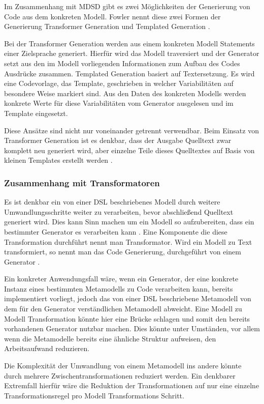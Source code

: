 \documentclass[12pt,oneside,a4paper,parskip]{scrbook}
\begin{document}
Im Zusammenhang mit MDSD gibt es zwei Möglichkeiten der Generierung von Code aus dem konkreten Modell. Fowler nennt diese zwei Formen der Generierung Transformer Generation und Templated Generation \cite[S. 124f.]{fowler2010}.

Bei der Transformer Generation werden aus einem konkreten Modell Statements einer Zielsprache generiert. Hierfür wird das Modell traversiert und der Generator setzt aus den im Modell vorliegenden Informationen zum Aufbau des Codes Ausdrücke zusammen. Templated Generation basiert auf Textersetzung. Es wird eine Codevorlage, das Template, geschrieben in welcher Variabilitäten auf besondere Weise markiert sind. Aus den Daten des konkreten Modells werden konkrete Werte für diese Variabilitäten vom Generator ausgelesen und im Template eingesetzt.

Diese Ansätze sind nicht nur voneinander getrennt verwendbar. Beim Einsatz von Transformer Generation ist es denkbar, dass der Ausgabe Quelltext zwar komplett neu generiert wird, aber einzelne Teile dieses Quelltextes auf Basis von kleinen Templates erstellt werden \cite[S. 125]{fowler2010}.

\subsubsection{Zusammenhang mit Transformatoren}

Es ist denkbar ein von einer DSL beschriebenes Modell durch weitere Umwandlungsschritte weiter zu verarbeiten, bevor abschließend Quelltext generiert wird. Dies kann Sinn machen um ein Modell so aufzubereiten, dass ein bestimmter Generator es verarbeiten kann \cite[S. 195]{stahl2007}. Eine Komponente die diese Transformation durchführt nennt man Transformator. Wird ein Modell zu Text transformiert, so nennt man das Code Generierung, durchgeführt von einem Generator \cite[S. 271]{voelter2013}.

Ein konkreter Anwendungsfall wäre, wenn ein Generator, der eine konkrete Instanz eines bestimmten Metamodells zu Code verarbeiten kann, bereits implementiert vorliegt, jedoch das von einer DSL beschriebene Metamodell von dem für den Generator verständlichen Metamodell abweicht. Eine Modell zu Modell Transformation könnte hier eine Brücke schlagen und somit den bereits vorhandenen Generator nutzbar machen. Dies könnte unter Umständen, vor allem wenn die Metamodelle bereits eine ähnliche Struktur aufweisen, den Arbeitsaufwand reduzieren.

Die Komplexität der Umwandlung von einem Metamodell ins andere könnte durch mehrere Zwischentransformationen reduziert werden. Ein denkbarer Extremfall hierfür wäre die Reduktion der Transformationen auf nur eine einzelne Transformationsregel pro Modell Transformations Schritt.
\end{document}
